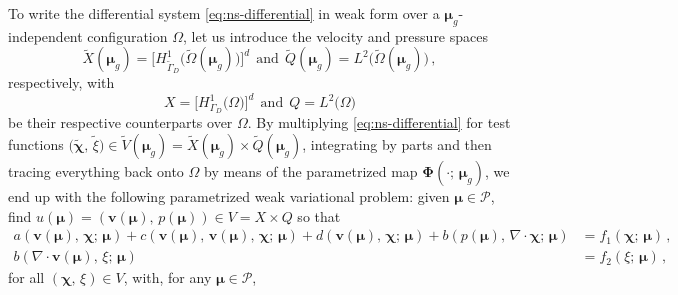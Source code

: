 \documentclass{elsarticle}
\numberwithin{equation}{section}
\theoremstyle{theorem}
\theoremstyle{definition}
\theoremstyle{remark}
\theoremstyle{proposition}
\numberwithin{figure}{section}
\newcommand{\wt}[1]{\widetilde{#1}}
\newcommand{\bg}[1]{\boldsymbol{#1}}
\begin{document}
		
		To write the differential system \eqref{eq:ns-differential} in weak form over a $\bg{\mu}_g$-independent configuration $\Omega$, let us introduce the velocity and pressure spaces \[ \wt{X}(\bg{\mu}_g) = \big[ H^1_{\wt{\Gamma}_D} \big( \wt{\Omega}(\bg{\mu}_g) \big) \big]^d ~~ \text{and} ~~ \wt{Q}(\bg{\mu}_g) = L^2 \big( \wt{\Omega}(\bg{\mu}_g) \big) \, , \] respectively, with \[ X = \big[ H^1_{\Gamma_D} \big( \Omega \big) \big]^d ~~ \text{and} ~~ Q = L^2 \big( \Omega \big) \] be their respective counterparts over $\Omega$. By multiplying \eqref{eq:ns-differential} for test functions $\big( \wt{\bg{\chi}}, \, \wt{\xi} \big) \in \wt{V}(\bg{\mu}_g) = \wt{X}(\bg{\mu}_g) \times \wt{Q}(\bg{\mu}_g)$, integrating by parts and then tracing everything back onto $\Omega$ by means of the parametrized map $\bg{\Phi}(\cdot; \, \bg{\mu}_g)$, we end up with the following parametrized weak variational problem: given $\bg{\mu} \in \mathcal{P}$, find $u(\bg{\mu}) = (\bg{v}(\bg{\mu}), \, p(\bg{\mu})) \in V = X \times Q$ so that
		\begin{equation*}
			\label{eq:ns-weak-reference}
			\begin{aligned}
				a(\bg{v}(\bg{\mu}), \, \bg{\chi}; \, \bg{\mu}) + c(\bg{v}(\bg{\mu}), \, \bg{v}(\bg{\mu}), \, \bg{\chi}; \, \bg{\mu}) + d(\bg{v}(\bg{\mu}), \, \bg{\chi}; \, \bg{\mu}) + b(p(\bg{\mu}), \, \nabla \cdot \bg{\chi}; \, \bg{\mu}) & = f_1(\bg{\chi}; \, \bg{\mu}) \, , \\
				b(\nabla \cdot \bg{v}(\bg{\mu}), \, \xi; \, \bg{\mu}) & = f_2(\xi; \, \bg{\mu}) \, ,
			\end{aligned}
		\end{equation*}
		for all $(\bg{\chi}, \, \xi) \in V$, with, for any $\bg{\mu} \in \mathcal{P}$,	
\end{document}
